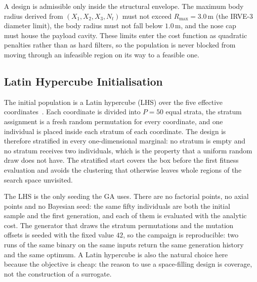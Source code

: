 A design is admissible only inside the structural envelope. The maximum body radius derived from $(X_1,X_2,X_3,N_t)$ must not exceed $R_{\max} = 3.0$\,m (the IRVE-3 diameter limit), the body radius must not fall below $1.0$\,m, and the nose cap must house the payload cavity. These limits enter the cost function as quadratic penalties rather than as hard filters, so the population is never blocked from moving through an infeasible region on its way to a feasible one.

\subsection{Latin Hypercube Initialisation}
The initial population is a Latin hypercube (LHS) over the five effective coordinates~\cite{mckay1979lhs}. Each coordinate is divided into $P=50$ equal strata, the stratum assignment is a fresh random permutation for every coordinate, and one individual is placed inside each stratum of each coordinate. The design is therefore stratified in every one-dimensional marginal: no stratum is empty and no stratum receives two individuals, which is the property that a uniform random draw does not have. The stratified start covers the box before the first fitness evaluation and avoids the clustering that otherwise leaves whole regions of the search space unvisited.

The LHS is the only seeding the GA uses. There are no factorial points, no axial points and no Bayesian seed: the same fifty individuals are both the initial sample and the first generation, and each of them is evaluated with the analytic cost. The generator that draws the stratum permutations and the mutation offsets is seeded with the fixed value $42$, so the campaign is reproducible: two runs of the same binary on the same inputs return the same generation history and the same optimum. A Latin hypercube is also the natural choice here because the objective is cheap: the reason to use a space-filling design is coverage, not the construction of a surrogate.

